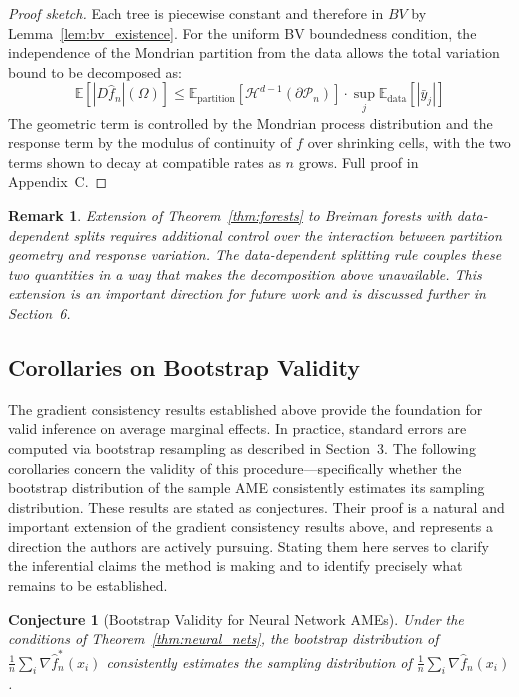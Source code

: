 \documentclass[12pt]{article}
\newtheorem{conjecture}{Conjecture}
\newtheorem{remark}{Remark}
\newcommand{\E}{\mathbb{E}}
\newcommand{\fn}{\hat{f}_n}
\begin{document}
	\begin{proof}[Proof sketch]
		Each tree is piecewise constant and therefore in $BV$ by
		Lemma~\ref{lem:bv_existence}. For the uniform BV boundedness condition, the
		independence of the Mondrian partition from the data allows the total variation bound
		to be decomposed as:
		\begin{equation}
			\E[|D\fn|(\Omega)] \leq
			\mathbb{E}_{\text{partition}}\!\left[\mathcal{H}^{d-1}(\partial \mathcal{P}_n)\right]
			\cdot \sup_j \mathbb{E}_{\text{data}}\!\left[|\bar{y}_j|\right]
		\end{equation}
		The geometric term is controlled by the Mondrian process distribution and the
		response term by the modulus of continuity of $f$ over shrinking cells, with the two
		terms shown to decay at compatible rates as $n$ grows. Full proof in Appendix~C.
	\end{proof}
	
	\begin{remark}
		Extension of Theorem~\ref{thm:forests} to Breiman forests with data-dependent splits
		requires additional control over the interaction between partition geometry and
		response variation. The data-dependent splitting rule couples these two quantities in
		a way that makes the decomposition above unavailable. This extension is an important
		direction for future work and is discussed further in Section~6.
	\end{remark}
	
	\subsection{Corollaries on Bootstrap Validity}
	
	The gradient consistency results established above provide the foundation for valid inference on average marginal effects. In practice, standard errors are computed via bootstrap resampling as described in Section~3. The following corollaries concern the validity of this procedure---specifically whether the bootstrap distribution of the sample AME consistently estimates its sampling distribution. These results are stated as conjectures. Their proof is a natural and important extension of the gradient consistency results above, and represents a direction the authors are actively pursuing. Stating them here serves to clarify the inferential claims the method is making and to identify precisely what remains to be established.
	
	\begin{conjecture}[Bootstrap Validity for Neural Network AMEs]
		\label{conj:bootstrap_nn}
		Under the conditions of Theorem~\ref{thm:neural_nets}, the bootstrap distribution
		of $\frac{1}{n}\sum_i \nabla \hat{f}_n^*(x_i)$ consistently estimates the sampling
		distribution of $\frac{1}{n}\sum_i \nabla \fn(x_i)$.
	\end{conjecture}
	
\end{document}
